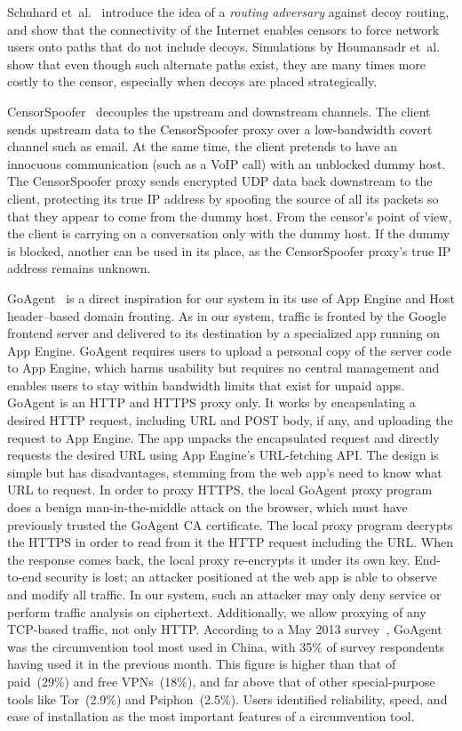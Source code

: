 \documentclass{article}
\begin{document}
Schuhard et~al.~\cite{ccs2012-decoys}
introduce the idea of a \emph{routing adversary} against decoy routing,
and show that the connectivity of the Internet enables
censors to force network users onto paths that do not include decoys.
Simulations by Houmansadr et~al.~\cite{nodirectionhome}
show that even though such alternate paths exist,
they are many times more costly to the censor,
especially when decoys are placed strategically.

CensorSpoofer~\cite{censorspoofer}
decouples the upstream and downstream channels.
The client sends upstream data to the CensorSpoofer proxy over a low-bandwidth covert channel such as email.
At the same time, the client pretends to have an innocuous communication (such as a VoIP call) with an unblocked dummy host.
The CensorSpoofer proxy sends encrypted UDP data back downstream to the client,
protecting its true IP address by spoofing the source of all its packets
so that they appear to come from the dummy host.
From the censor's point of view, the client is carrying on a conversation only with the dummy host.
If the dummy is blocked, another can be used in its place,
as the CensorSpoofer proxy's true IP address remains unknown.


GoAgent~\cite{goagent} is a direct inspiration for our system in its use of App
Engine and Host header--based domain fronting.
As in our system, traffic is fronted by the Google frontend server
and delivered to its destination by a specialized app running on App Engine.
GoAgent requires users to upload a personal copy of the server code to App Engine,
which harms usability but requires no central management
and enables users to stay within bandwidth limits that exist for unpaid apps.
GoAgent is an HTTP and HTTPS proxy only.
It works by encapsulating a desired HTTP request, including URL and POST body, if any,
and uploading the request to App Engine.
The app unpacks the encapsulated request and directly requests the desired URL using
App Engine's URL-fetching API.
The design is simple but has disadvantages, stemming from the web app's
need to know what URL to request.
In order to proxy HTTPS, the local GoAgent proxy program does a benign man-in-the-middle
attack on the browser, which must have previously trusted the GoAgent CA certificate.
The local proxy program decrypts the HTTPS in order to read from it the HTTP request including the URL.
When the response comes back, the local proxy re-encrypts it under its own key.
End-to-end security is lost; an attacker positioned at the web app
is able to observe and modify all traffic.
In our system, such an attacker may only deny service or perform traffic analysis on ciphertext.
Additionally, we allow proxying of any TCP-based traffic, not only HTTP.
According to a May 2013 survey~\cite{collateral-freedom},
GoAgent was the circumvention tool most used in
China, with 35\% of survey respondents having used it in the previous month.
This figure is higher than that of paid~(29\%) and free VPNs~(18\%), and far
above that of other special-purpose tools like Tor~(2.9\%) and Psiphon~(2.5\%).
Users identified reliability, speed, and ease of installation as the most important features of a circumvention tool.
\end{document}

